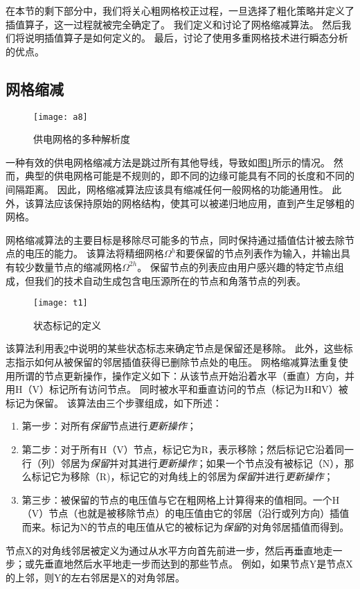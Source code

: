 在本节的剩下部分中，我们将关心粗网格校正过程，一旦选择了粗化策略并定义了插值算子，这一过程就被完全确定了。 我们定义和讨论了网格缩减算法。 然后我们将说明插值算子是如何定义的。 最后，讨论了使用多重网格技术进行瞬态分析的优点。

\subsection{网格缩减}

\begin{figure}[H] %
  \centering
  \texttt{[image: a8]}
  \caption{供电网格的多种解析度}
  \label{fig:a8}
\end{figure}

一种有效的供电网格缩减方法是跳过所有其他导线，导致如图\ref{fig:a8}所示的情况。 然而，典型的供电网格可能是不规则的，即不同的边缘可能具有不同的长度和不同的间隔距离。 因此，网格缩减算法应该具有缩减任何一般网格的功能通用性。 此外，该算法应该保持原始的网格结构，使其可以被递归地应用，直到产生足够粗的网格。

网格缩减算法的主要目标是移除尽可能多的节点，同时保持通过插值估计被去除节点的电压的能力。 该算法将精细网格$\Omega^h$和要保留的节点列表作为输入，并输出具有较少数量节点的缩减网格$\Omega^{2h}$。 保留节点的列表应由用户感兴趣的特定节点组成，但我们的技术自动生成包含电压源所在的节点和角落节点的列表。


\begin{figure}[H] %
  \centering
  \texttt{[image: t1]}
  \caption{状态标记的定义}
  \label{fig:t1}
\end{figure}

该算法利用表\ref{fig:t1}中说明的某些状态标志来确定节点是保留还是移除。 此外，这些标志指示如何从被保留的邻居插值获得已删除节点处的电压。 网格缩减算法重复使用所谓的节点更新操作，操作定义如下：从该节点开始沿着水平（垂直）方向，并用H（V）标记所有访问节点。 同时被水平和垂直访问的节点（标记为H和V）被标记为保留。 该算法由三个步骤组成，如下所述：
\begin{enumerate}
\item 第一步：对所有\emph{保留}节点进行\emph{更新操作}；
\item 第二步：对于所有H（V）节点，标记它为R，表示移除；然后标记它沿着同一行（列）邻居为\emph{保留}并对其进行\emph{更新操作}；如果一个节点没有被标记（N），那么标记它为移除（R)，标记它的对角线上的邻居为\emph{保留}并进行\emph{更新操作}；
\item 第三步：被保留的节点的电压值与它在粗网格上计算得来的值相同。一个H（V）节点（也就是被移除节点）的电压值由它的邻居（沿行或列方向）插值而来。标记为N的节点的电压值从它的被标记为\emph{保留}的对角邻居插值而得到。
\end{enumerate}
节点X的对角线邻居被定义为通过从水平方向首先前进一步，然后再垂直地走一步；或先垂直地然后水平地走一步而达到的那些节点。 例如，如果节点Y是节点X的上邻，则Y的左右邻居是X的对角邻居。

